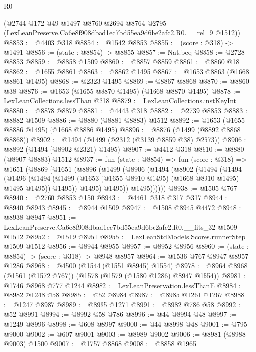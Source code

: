\begin{lexlean}{R0}
\begin{coremodule}
    (@2744
      @172
      @49
      @1497
      @8760
      @2694
      @8764
      @2795
      (LexLeanPreserve.Ca6e8f908dbad1ec7bd55ea9d6be2afc2.R0.__rel_9 @1512))
@8853 := @4403 @318
@8854 := @1542 @8853
@8855 := (score : @318) -> @1491
@8856 := (state : @8854) -> @8855
@8857 := Nat.beq
@8858 := @2728 @8853
@8859 := @8858 @1509
@8860 := @8857 @8859
@8861 := @8860 @18
@8862 := @1655 @8861
@8863 := @8862 @1495
@8867 := @1653 @8863 (@1668 @8861 @1495)
@8868 := @2323 @1495
@8869 := @8867 @8868
@8870 := @8860 @38
@8876 := @1653 (@1655 @8870 @1495) (@1668 @8870 @1495)
@8878 := LexLeanCollections.lessThan @318
@8879 := LexLeanCollections.instKeyInt
@8880 := @8878 @8879
@8881 := @4443 @318
@8882 := @2739 @8853
@8883 := @8882 @1509
@8886 := @8880 (@8881 @8883) @1512
@8892 := @1653 (@1655 @8886 @1495) (@1668 @8886 @1495)
@8896 := @8876 (@1499 (@8892 @8868 @8868))
@8902 := @1494 (@1499 (@2312 (@3139 @8859 @38) @2673))
@8906 := @8892 (@1494 (@8902 @2321) @1495)
@8907 := @4412 @318
@8910 := @8880 (@8907 @8883) @1512
@8937 := fun (state : @8854) =>
  fun (score : @318) =>
  @1651
    (@8869
      (@1651
        (@8896
          (@1499
            (@8906
              (@1494
                (@8902
                  (@1494
                    (@1494
                      (@1496
                        (@1494
                          (@1499 (@1653 (@1655 @8910 @1495) (@1668 @8910 @1495) @1495 @1495))
                          @1495))
                      @1495)
                    @1495))
                @1495))))))
@8938 := @1505 @767
@8940 := @2760 @8853 @150
@8943 := @4461 @318 @317 @317
@8944 := @8940 @8943
@8945 := @8944 @1509
@8947 := @1508 @8945 @4472
@8948 := @8938 @8947
@8951 := LexLeanPreserve.Ca6e8f908dbad1ec7bd55ea9d6be2afc2.R0.__fits_32 @1509 @1512
@8952 := @1519 @8951
@8955 := LexLeanStdModels.Scores.runnerStep @1509 @1512
@8956 := @8944 @8955
@8957 := @8952 @8956
@8960 := (state : @8854) -> (score : @318) -> @8948 @8957
@8964 := @1536 @767 @8947 @8957 @1286
@8968 := @4500 (@1544 (@1551 @8945) @1554)
@8978 := @8964 @8968 (@1561 (@1572 @767)) (@1578 (@1579 (@1580 @1286) @8947 @1554))
@8981 := @1746 @8968 @777 @1244
@8982 := LexLeanPreservation.lessThanE
@8984 := @8982 @1248 @58
@8985 := @52 @8984
@8987 := @8985 @1261 @1267
@8988 := @1247 @8987
@8989 := @8985 @1271
@8991 := @8982 @786 @58
@8992 := @52 @8991
@8994 := @8992 @58 @786
@8996 := @44 @8994 @48
@8997 := @1249 @8996
@8998 := @608 @8997
@9000 := @44 @8998 @48
@9001 := @795 @9000
@9002 := @607 @9001
@9003 := @8989 @9002
@9006 := @8981 (@8988 @9003) @1500
@9007 := @1757 @8868
@9008 := @8858 @1965

\end{coremodule}
\end{lexlean}
